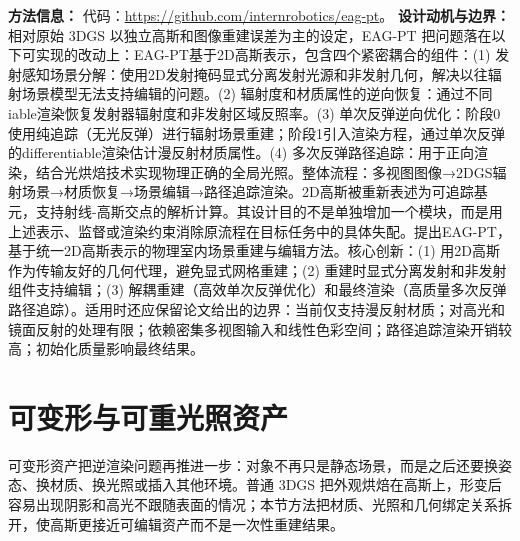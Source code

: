 \textbf{方法信息：} 代码：\url{https://github.com/internrobotics/eag-pt}。
\textbf{设计动机与边界：} 相对原始 3DGS 以独立高斯和图像重建误差为主的设定，EAG-PT 把问题落在以下可实现的改动上：EAG-PT基于2D高斯表示，包含四个紧密耦合的组件：(1) 发射感知场景分解：使用2D发射掩码显式分离发射光源和非发射几何，解决以往辐射场景模型无法支持编辑的问题。(2) 辐射度和材质属性的逆向恢复：通过不同iable渲染恢复发射器辐射度和非发射区域反照率。(3) 单次反弹逆向优化：阶段0使用纯追踪（无光反弹）进行辐射场景重建；阶段1引入渲染方程，通过单次反弹的differentiable渲染估计漫反射材质属性。(4) 多次反弹路径追踪：用于正向渲染，结合光烘焙技术实现物理正确的全局光照。整体流程：多视图图像→2DGS辐射场景→材质恢复→场景编辑→路径追踪渲染。2D高斯被重新表述为可追踪基元，支持射线-高斯交点的解析计算。其设计目的不是单独增加一个模块，而是用上述表示、监督或渲染约束消除原流程在目标任务中的具体失配。提出EAG-PT，基于统一2D高斯表示的物理室内场景重建与编辑方法。核心创新：(1) 用2D高斯作为传输友好的几何代理，避免显式网格重建；(2) 重建时显式分离发射和非发射组件支持编辑；(3) 解耦重建（高效单次反弹优化）和最终渲染（高质量多次反弹路径追踪）。适用时还应保留论文给出的边界：当前仅支持漫反射材质；对高光和镜面反射的处理有限；依赖密集多视图输入和线性色彩空间；路径追踪渲染开销较高；初始化质量影响最终结果。

\section{可变形与可重光照资产}

可变形资产把逆渲染问题再推进一步：对象不再只是静态场景，而是之后还要换姿态、换材质、换光照或插入其他环境。普通 3DGS 把外观烘焙在高斯上，形变后容易出现阴影和高光不跟随表面的情况；本节方法把材质、光照和几何绑定关系拆开，使高斯更接近可编辑资产而不是一次性重建结果。
